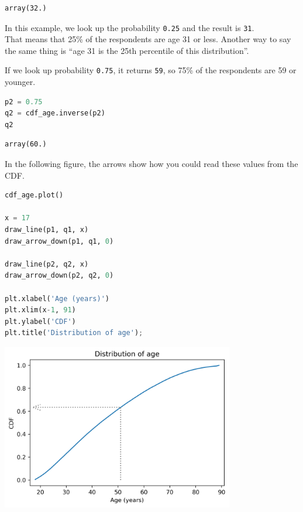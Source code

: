 \begin{lstlisting}[style=output]
array(32.)
\end{lstlisting}

In this example, we look up the probability
\passthrough{\lstinline!0.25!} and the result is
\passthrough{\lstinline!31!}.\\
That means that 25\% of the respondents are age 31 or less. Another way
to say the same thing is ``age 31 is the 25th percentile of this
distribution''.

If we look up probability \passthrough{\lstinline!0.75!}, it returns
\passthrough{\lstinline!59!}, so 75\% of the respondents are 59 or
younger.

\begin{lstlisting}[language=Python,style=source]
p2 = 0.75
q2 = cdf_age.inverse(p2)
q2
\end{lstlisting}

\begin{lstlisting}[style=output]
array(60.)
\end{lstlisting}

In the following figure, the arrows show how you could read these values
from the CDF.

\begin{lstlisting}[language=Python,style=source]
cdf_age.plot()

x = 17
draw_line(p1, q1, x)
draw_arrow_down(p1, q1, 0)

draw_line(p2, q2, x)
draw_arrow_down(p2, q2, 0)

plt.xlabel('Age (years)')
plt.xlim(x-1, 91)
plt.ylabel('CDF')
plt.title('Distribution of age');
\end{lstlisting}

\begin{center}
\includegraphics[width=4in]{chapters/08_distributions_files/08_distributions_72_0.png}
\end{center}

